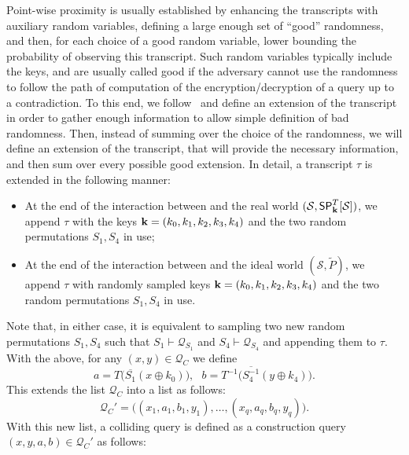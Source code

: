 Point-wise proximity is usually established by enhancing the transcripts with auxiliary random variables, defining a large enough set of ``good'' randomness, and then, for each choice of a good random variable, lower bounding the probability of observing this transcript. Such random variables typically include the keys, and are usually called good if the adversary cannot use the randomness to follow the path of computation of the encryption/decryption of a query up to a contradiction. To this end, we follow~\cite[Sect. 4.2]{C:CDKLST18} and define an extension of the transcript in order to gather enough information to allow simple definition of bad randomness. Then, instead of summing over the choice of the randomness, we will define an extension of the transcript, that will provide the necessary information, and then sum over every possible good extension. In detail, a transcript $\tau$ is extended in the following manner:
\begin{itemize}
	\item At the end of the interaction between \dis and the real world $(\mathcal{S},\mathsf{SP}_{\mathbf{k}}^T[\mathcal{S}])$, we append $\tau$ with the keys $\mathbf{k}=(k_0,k_1,k_2,k_3,k_4)$ and the two random permutations $S_1,S_4$ in use;
	\item At the end of the interaction between \dis and the ideal world $(\mathcal{S},\widetilde{P})$, we append $\tau$ with randomly sampled keys $\mathbf{k}=(k_0,k_1,k_2,k_3,k_4)$ and the two random permutations $S_1,S_4$ in use.
\end{itemize}
Note that, in either case, it is equivalent to sampling two new random permutations $S_1,S_4$ such that $S_1\vdash\mathcal{Q}_{S_{1}}$ and $S_4\vdash\mathcal{Q}_{S_4}$ and appending them to $\tau$. With the above, for any $(x,y)\in\mathcal{Q}_C$ we define
%
$$a=T\big(\overline{S_1}\left(x \oplus k_{0}\right)\big),\ \ \  b=T^{-1}\big(\overline{S_{4}^{-1}}\left(y \oplus k_{4}\right)\big).$$
%
This extends the list $\mathcal{Q}_C$ into a list as follows:
%
$$\mathcal{Q}_C'=\big((x_1,a_1,b_1,y_1),\ldots,(x_q,a_q,b_q,y_q)\big).$$
%
With this new list, a colliding query is defined as a construction query $(x,y,a,b)\in\mathcal{Q}_C'$ as follows:
%
